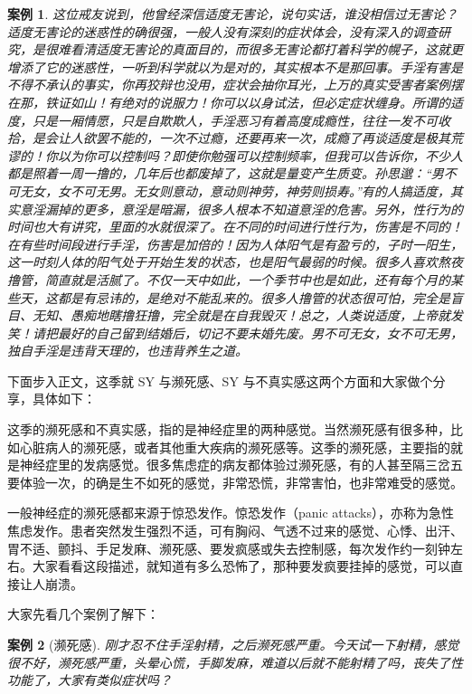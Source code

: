 \documentclass{ctexart}
\newtheorem{case}{案例}
\begin{document}
\begin{case}
    这位戒友说到，他曾经深信适度无害论，说句实话，谁没相信过无害论？适度无害论的迷惑性的确很强，一般人没有深刻的症状体会，没有深入的调查研究，是很难看清适度无害论的真面目的，而很多无害论都打着科学的幌子，这就更增添了它的迷惑性，一听到科学就以为是对的，其实根本不是那回事。手淫有害是不得不承认的事实，你再狡辩也没用，症状会抽你耳光，上万的真实受害者案例摆在那，铁证如山！有绝对的说服力！你可以以身试法，但必定症状缠身。所谓的适度，只是一厢情愿，只是自欺欺人，手淫恶习有着高度成瘾性，往往一发不可收拾，是会让人欲罢不能的，一次不过瘾，还要再来一次，成瘾了再谈适度是极其荒谬的！你以为你可以控制吗？即使你勉强可以控制频率，但我可以告诉你，不少人都是照着一周一撸的，几年后也都废掉了，这就是量变产生质变。孙思邈：“男不可无女，女不可无男。无女则意动，意动则神劳，神劳则损寿。”有的人搞适度，其实意淫漏掉的更多，意淫是暗漏，很多人根本不知道意淫的危害。另外，性行为的时间也大有讲究，里面的水就很深了。在不同的时间进行性行为，伤害是不同的！在有些时间段进行手淫，伤害是加倍的！因为人体阳气是有盈亏的，子时一阳生，这一时刻人体的阳气处于开始生发的状态，也是阳气最弱的时候。很多人喜欢熬夜撸管，简直就是活腻了。不仅一天中如此，一个季节中也是如此，还有每个月的某些天，这都是有忌讳的，是绝对不能乱来的。很多人撸管的状态很可怕，完全是盲目、无知、愚痴地瞎撸狂撸，完全就是在自我毁灭！总之，人类说适度，上帝就发笑！请把最好的自己留到结婚后，切记不要未婚先废。男不可无女，女不可无男，独自手淫是违背天理的，也违背养生之道。
\end{case}

下面步入正文，这季就 SY 与濒死感、SY 与不真实感这两个方面和大家做个分享，具体如下：

这季的濒死感和不真实感，指的是神经症里的两种感觉。当然濒死感有很多种，比如心脏病人的濒死感，或者其他重大疾病的濒死感等。这季的濒死感，主要指的就是神经症里的发病感觉。很多焦虑症的病友都体验过濒死感，有的人甚至隔三岔五要体验一次，的确是生不如死的感觉，非常恐慌，非常害怕，也非常难受的感觉。

一般神经症的濒死感都来源于惊恐发作。惊恐发作（panic attacks），亦称为急性焦虑发作。患者突然发生强烈不适，可有胸闷、气透不过来的感觉、心悸、出汗、胃不适、颤抖、手足发麻、濒死感、要发疯感或失去控制感，每次发作约一刻钟左右。大家看看这段描述，就知道有多么恐怖了，那种要发疯要挂掉的感觉，可以直接让人崩溃。

大家先看几个案例了解下：

\begin{case}[濒死感]
    刚才忍不住手淫射精，之后濒死感严重。今天试一下射精，感觉很不好，濒死感严重，头晕心慌，手脚发麻，难道以后就不能射精了吗，丧失了性功能了，大家有类似症状吗？
\end{case}
\end{document}
